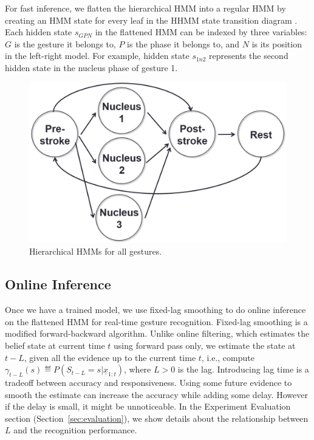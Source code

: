 For fast inference, we
flatten the hierarchical HMM into a regular HMM by creating an HMM state for
every leaf in the HHMM state transition diagram \cite{murphy02}. Each
hidden state $s_{GPN}$ in the flattened HMM can be indexed by three variables:
$G$ is the gesture it belongs to, $P$ is the phase it belongs to, and $N$ is its
position in the left-right model. For example, hidden state $s_{1n2}$ represents the
second hidden state in the nucleus phase of gesture 1.

\begin{figure}[t]
\centering
\includegraphics[width=0.7\columnwidth]{figures/combined.png}
\caption{Hierarchical HMMs for all gestures.}
\label{fig:combined}
\end{figure}

\subsection{Online Inference}
Once we have a trained model, we use fixed-lag smoothing \cite{murphy02} to do
online inference on the flattened HMM for real-time gesture recognition.
Fixed-lag smoothing is a modified forward-backward algorithm. Unlike online
filtering, which estimates the belief state at current time $t$ using forward
pass only, we estimate the state at $t - L$, given all the evidence up to the
current time $t$, i.e., compute $\gamma_{t - L}(s) \eqdef P(S_{t -
L} = s|\underline{x}_{1:t})$, where $L > 0$ is the lag. Introducing lag time is
a tradeoff between accuracy and responsiveness. Using some future evidence to
smooth the estimate can increase the accuracy while adding some delay. However
if the delay is small, it might be unnoticeable.
In the Experiment Evaluation section (Section~\ref{sec:evaluation}), we show
details about the relationship between $L$ and the recognition performance.

